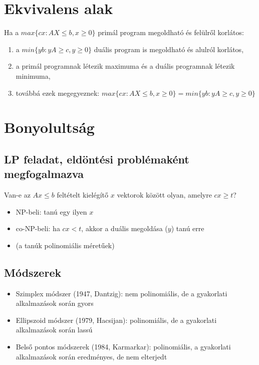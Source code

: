 \section*{Ekvivalens alak}
\begin{theo}
Ha a $max\lbrace cx:AX\leq b,x\geq 0\rbrace$ primál program megoldható és felülről korlátos:
\begin{enumerate}
\item a $min \lbrace yb:yA\geq c, y \geq 0\rbrace$ duális program is megoldható és alulról korlátos,
\item	a primál programnak létezik maximuma és a duális programnak létezik minimuma,
\item	továbbá ezek megegyeznek: $max\lbrace cx:AX\leq b,x\geq 0\rbrace = min \lbrace yb:yA\geq c, y \geq 0\rbrace$
\end{enumerate}
\end{theo}

\section*{Bonyolultság}
\subsection*{LP feladat, eldöntési problémaként megfogalmazva}
Van-e az $Ax\leq b$ feltételt kielégítő $x$ vektorok között olyan, amelyre $cx\geq t$?
\begin{itemize}
	\item NP-beli: tanú egy ilyen $x$
	\item co-NP-beli: ha $cx<t$, akkor a duális megoldása ($y$) tanú erre
	\item (a tanúk polinomiális méretűek)
\end{itemize}

\subsection*{Módszerek}
\begin{itemize}
\item Szimplex módszer (1947, Dantzig): nem polinomiális, de a gyakorlati alkalmazások során gyors
\item Ellipszoid módszer (1979, Hacsijan): polinomiális, de a gyakorlati alkalmazások során lassú
\item Belső pontos módszerek (1984, Karmarkar): polinomiális, a gyakorlati alkalmazások során eredményes, de nem elterjedt
\end{itemize}
